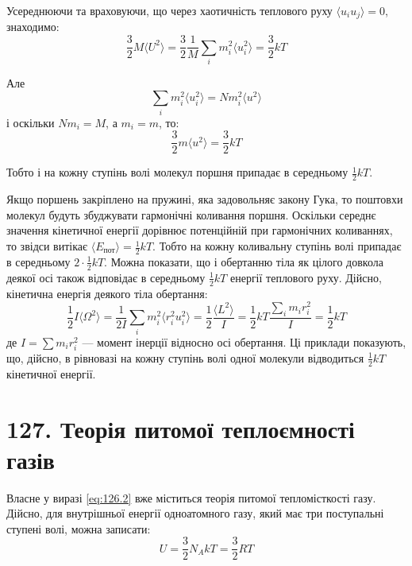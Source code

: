 Усереднюючи та враховуючи, що через хаотичність теплового руху $\langle u_{i}u_{j} \rangle = 0$,
знаходимо:
\begin{equation}
    \frac{3}{2}M\langle U^{2} \rangle = \frac{3}{2}\frac{1}{M}\sum_{i} m_{i}^{2}\langle u_{i}^{2}
    \rangle = \frac{3}{2}kT
    \label{eq:126.5}
\end{equation}

Але
\begin{equation*}
    \sum_{i} m_{i}^{2}\langle u_{i}^{2} \rangle = Nm_{i}^{2}\langle u^{2} \rangle
\end{equation*}
і оскільки $Nm_{i} = M$, а $m_{i} = m$, то:
\begin{equation}
    \frac{3}{2}m\langle u^{2} \rangle = \frac{3}{2}kT
    \label{eq:126.6}
\end{equation}

Тобто і на кожну ступінь волі молекул поршня припадає в середньому $\frac{1}{2}kT$.

Якщо поршень закріплено на пружині, яка задовольняє закону Гука, то поштовхи молекул будуть збуджувати
гармонічні коливання поршня. Оскільки середнє значення кінетичної енергії дорівнює потенційній при
гармонічних коливаннях, то звідси витікає $\langle E_{\text{пот}} \rangle = \frac{1}{2}kT$. Тобто на
кожну коливальну ступінь волі припадає в середньому $2 \cdot \frac{1}{2}kT$. Можна показати, що і
обертанню тіла як цілого довкола деякої осі також відповідає в середньому $\frac{1}{2}kT$ енергії
теплового руху. Дійсно, кінетична енергія деякого тіла обертання:
\begin{equation}
    \frac{1}{2}I\langle \Omega^{2} \rangle = \frac{1}{2I}\sum_{i} m_{i}^{2}\langle r_{i}^{2}u_{i}^{2}
    \rangle = \frac{1}{2}\frac{\langle L^{2} \rangle}{I} = \frac{1}{2}kT\frac{\sum_{i}
    m_{i}r_{i}^{2}}{I} = \frac{1}{2}kT
    \label{eq:126.7}
\end{equation}
де $I = \sum m_{i}r_{i}^{2}$ --- момент інерції відносно осі обертання. Ці приклади показують, що,
дійсно, в рівновазі на кожну ступінь волі одної молекули відводиться $\frac{1}{2}kT$ кінетичної
енергії.


\section*{127. Теорія питомої теплоємності газів}

Власне у виразі \eqref{eq:126.2} вже міститься теорія питомої тепломісткості газу. Дійсно, для
внутрішньої енергії одноатомного газу, який має три поступальні ступені волі, можна записати:
\begin{equation}
    U = \frac{3}{2}N_{A}kT = \frac{3}{2}RT
    \label{eq:127.1}
\end{equation}

